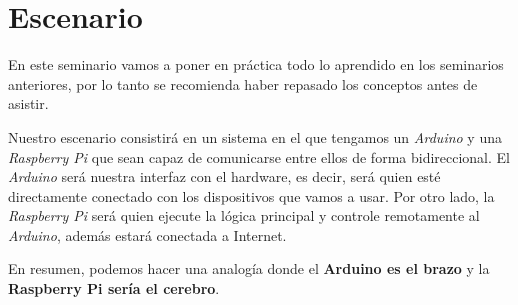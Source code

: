 \section{Escenario}\label{escenario}

En este seminario vamos a poner en práctica todo lo aprendido en los
seminarios anteriores, por lo tanto se recomienda haber repasado los
conceptos antes de asistir.

Nuestro escenario consistirá en un sistema en el que tengamos un
\emph{Arduino} y una \emph{Raspberry Pi} que sean capaz de comunicarse
entre ellos de forma bidireccional. El \emph{Arduino} será nuestra
interfaz con el hardware, es decir, será quien esté directamente
conectado con los dispositivos que vamos a usar. Por otro lado, la
\emph{Raspberry Pi} será quien ejecute la lógica principal y controle
remotamente al \emph{Arduino}, además estará conectada a Internet.

En resumen, podemos hacer una analogía donde el \textbf{Arduino es el
brazo} y la \textbf{Raspberry Pi sería el cerebro}.